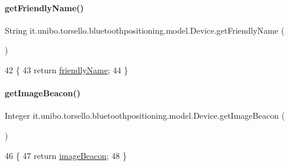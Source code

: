 \paragraph{\texorpdfstring{get\+Friendly\+Name()}{getFriendlyName()}}
{\footnotesize\ttfamily String it.\+unibo.\+torsello.\+bluetoothpositioning.\+model.\+Device.\+get\+Friendly\+Name (\begin{DoxyParamCaption}{ }\end{DoxyParamCaption})}


\begin{DoxyCode}
42                                     \{
43         \textcolor{keywordflow}{return} \hyperlink{classit_1_1unibo_1_1torsello_1_1bluetoothpositioning_1_1model_1_1Device_aa9a540b316c9de7f9b3a94f58570f6d3_aa9a540b316c9de7f9b3a94f58570f6d3}{friendlyName};
44     \}
\end{DoxyCode}
\hypertarget{classit_1_1unibo_1_1torsello_1_1bluetoothpositioning_1_1model_1_1Device_a0fe04c6168a9a13bdf65eb0e5d407d37_a0fe04c6168a9a13bdf65eb0e5d407d37}{}\label{classit_1_1unibo_1_1torsello_1_1bluetoothpositioning_1_1model_1_1Device_a0fe04c6168a9a13bdf65eb0e5d407d37_a0fe04c6168a9a13bdf65eb0e5d407d37} 
\paragraph{\texorpdfstring{get\+Image\+Beacon()}{getImageBeacon()}}
{\footnotesize\ttfamily Integer it.\+unibo.\+torsello.\+bluetoothpositioning.\+model.\+Device.\+get\+Image\+Beacon (\begin{DoxyParamCaption}{ }\end{DoxyParamCaption})}


\begin{DoxyCode}
46                                     \{
47         \textcolor{keywordflow}{return} \hyperlink{classit_1_1unibo_1_1torsello_1_1bluetoothpositioning_1_1model_1_1Device_a2faee0d51162a4efebfc2db787901019_a2faee0d51162a4efebfc2db787901019}{imageBeacon};
48     \}
\end{DoxyCode}
\hypertarget{classit_1_1unibo_1_1torsello_1_1bluetoothpositioning_1_1model_1_1Device_a7f7e47588f721b360447d0f6ae2c4a9d_a7f7e47588f721b360447d0f6ae2c4a9d}{}\label{classit_1_1unibo_1_1torsello_1_1bluetoothpositioning_1_1model_1_1Device_a7f7e47588f721b360447d0f6ae2c4a9d_a7f7e47588f721b360447d0f6ae2c4a9d} 
